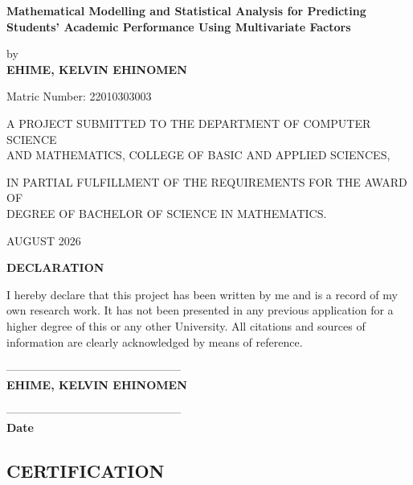 \documentclass[12pt]{report}
\begin{document}
\justifying
	\begin{center}
		{\huge{\textbf{ Mathematical Modelling and Statistical Analysis for Predicting Students’ Academic Performance Using Multivariate Factors }}}
	\end{center}
	
	\begin{center}
		by\\
		\vspace{1.4cm}
		\Large{\bf{EHIME, KELVIN EHINOMEN}}
	\end{center}
	
	\vspace{1.4cm}
	\begin{center}
		Matric Number: 22010303003
	\end{center}
	
	\vspace{3cm}
	\begin{center}
		A PROJECT SUBMITTED TO THE DEPARTMENT OF COMPUTER SCIENCE\\
		AND MATHEMATICS, COLLEGE OF BASIC AND APPLIED SCIENCES,
	\end{center}
	\begin{center}
		IN PARTIAL FULFILLMENT OF THE REQUIREMENTS FOR THE AWARD OF\\
		DEGREE OF BACHELOR OF SCIENCE IN MATHEMATICS.
	\end{center}
	
	\vspace{3cm}
	\begin{center}
		AUGUST 2026
	\end{center}
	
	\newpage
	\begin{center}
		\Large{\textbf{DECLARATION}}
	\end{center}
	
	\noindent I hereby declare that this project has been written by me and is a record of my own research work. It has not been presented in any previous application for a higher degree of this or any other University. All citations and sources of information are clearly acknowledged by means of reference.
	
	\vspace{1cm}
	\begin{center}
		----------------------------------------------- \\
		\textbf{EHIME, KELVIN EHINOMEN}
	\end{center}
	\begin{center}
		----------------------------------------------- \\
		\textbf{Date}
	\end{center}
	\newpage
	\begin{center}
		\section*{CERTIFICATION}
	\end{center}
	
\end{document}

